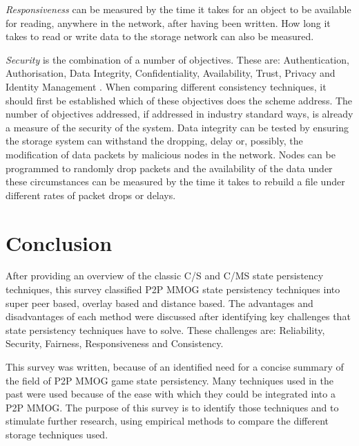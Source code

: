 \documentclass[10pt,a4paper,journal,cspaper,compsoc]{IEEEtran}
\begin{document}
\emph{Responsiveness} can be measured by the time it takes for an object to be available for reading, anywhere in the network, after having been
written. How long it takes to read or write data to the storage network can also be measured.

\emph{Security} is the combination of a number of objectives. These are: Authentication, Authorisation, Data Integrity, Confidentiality,
Availability, Trust, Privacy and Identity Management \cite{distributed_systems_security}. When comparing different consistency techniques, it should
first be established which of these objectives does the scheme address. The number of objectives addressed, if addressed in industry standard ways,
is already a measure of the security of the system. Data integrity can be tested by ensuring the storage system can withstand the dropping, delay or,
possibly, the modification of data packets by malicious nodes in the network. Nodes can be programmed to randomly drop packets and the availability
of the data under these circumstances can be measured by the time it takes to rebuild a file under different rates of packet drops or delays.


\section{Conclusion}


After providing an overview of the classic C/S and C/MS state persistency techniques, this survey classified P2P MMOG state persistency techniques
into super peer based, overlay based and distance based. The advantages and disadvantages of each method were discussed after identifying key
challenges that state persistency techniques have to solve. These challenges are: Reliability, Security, Fairness, Responsiveness and Consistency.

This survey was written, because of an identified need for a concise summary of the field of P2P MMOG game state persistency. Many techniques used in
the past were used because of the ease with which they could be integrated into a P2P MMOG. The purpose of this survey is to identify those
techniques and to stimulate further research, using empirical methods to compare the different storage techniques used.

\newpage
{} %



\end{document}
